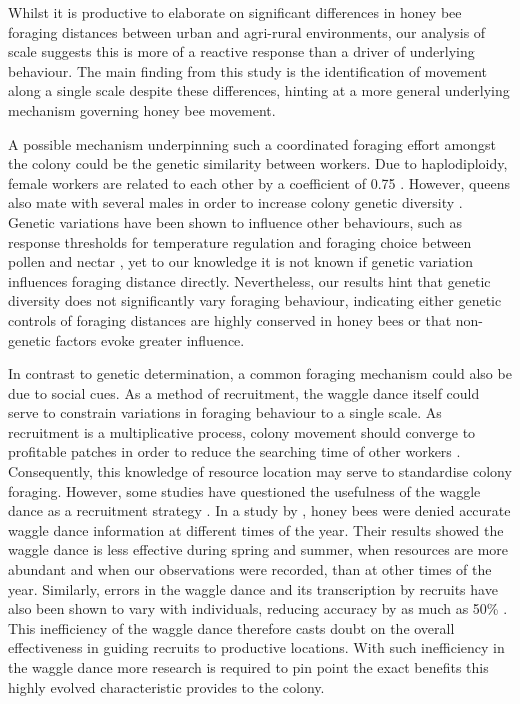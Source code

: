 \documentclass[11pt,usenames,dvipsnames,a4paper]{article}
\begin{document}
\begin{linenumbers}
Whilst it is productive to elaborate on significant differences in honey bee foraging distances between urban and agri-rural environments, our analysis of scale suggests this is more of a reactive response than a driver of underlying behaviour. The main finding from this study is the identification of movement along a single scale despite these differences, hinting at a more general underlying mechanism governing honey bee movement.

A possible mechanism underpinning such a coordinated foraging effort amongst the colony could be the genetic similarity between workers. Due to haplodiploidy, female workers are related to each other by a coefficient of 0.75 \citep{Ratnieks1989}. However, queens also mate with several males in order to increase colony genetic diversity \citep{Jones2004}. Genetic variations have been shown to influence other behaviours, such as response thresholds for temperature regulation \citep{Jones2004} and foraging choice between pollen and nectar \citep{Fewell1993, Fewell2000}, yet to our knowledge it is not known if genetic variation influences foraging distance directly. Nevertheless, our results hint that genetic diversity does not significantly vary foraging behaviour, indicating either genetic controls of foraging distances are highly conserved in honey bees or that non-genetic factors evoke greater influence.

In contrast to genetic determination, a common foraging mechanism could also be due to social cues. As a method of recruitment, the waggle dance itself could serve to constrain variations in foraging behaviour to a single scale. As recruitment is a multiplicative process, colony movement should converge to profitable patches in order to reduce the searching time of other workers \citep{Seeley1995}. Consequently, this knowledge of resource location may serve to standardise colony foraging. However, some studies have questioned the usefulness of the waggle dance as a recruitment strategy \citep{Sherman2002, Dornhaus2004, Gruter2008, Gruter2009, Schurch2013}. In a study by \cite{Sherman2002}, honey bees were denied accurate waggle dance information at different times of the year. Their results showed the waggle dance is less effective during spring and summer, when resources are more abundant and when our observations were recorded, than at other times of the year. Similarly, errors in the waggle dance and its transcription by recruits have also been shown to vary with individuals, reducing accuracy by as much as 50\% \citep{Schurch2013}. This inefficiency of the waggle dance therefore casts doubt on the overall effectiveness in guiding recruits to productive locations. With such inefficiency in the waggle dance more research is required to pin point the exact benefits this highly evolved characteristic provides to the colony.


\end{linenumbers}
\end{document}
